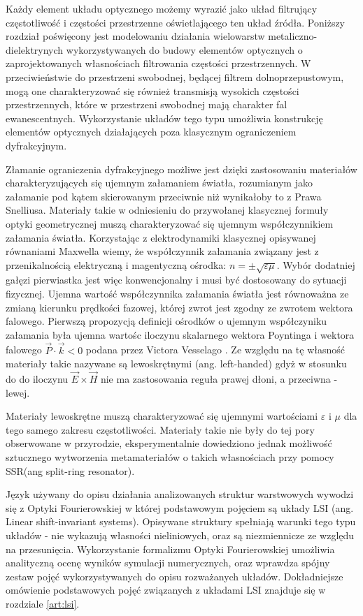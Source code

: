 Każdy element układu optycznego możemy wyrazić jako układ filtrujący częstotliwość i częstości przestrzenne oświetlającego ten układ źródła. Poniższy rozdział poświęcony jest modelowaniu działania wielowarstw metaliczno-dielektrynych wykorzystywanych do  budowy elementów optycznych o zaprojektowanych własnościach filtrowania częstości przestrzennych. W przeciwieństwie do przestrzeni swobodnej, będącej filtrem dolnoprzepustowym, mogą one charakteryzować się również transmisją wysokich częstości przestrzennych, które w przestrzeni swobodnej mają charakter fal ewanescentnych. Wykorzystanie układów tego typu umożliwia konstrukcję elementów optycznych działających poza klasycznym ograniczeniem dyfrakcyjnym.

Złamanie ograniczenia dyfrakcyjnego możliwe jest dzięki zastosowaniu materiałów charakteryzujących się ujemnym załamaniem światła, rozumianym jako załamanie pod kątem skierowanym przeciwnie niż wynikałoby to z Prawa Snelliusa. Materiały takie w odniesieniu do przywołanej klasycznej formuły optyki geometrycznej muszą charakteryzować się ujemnym współczynnikiem załamania światła. Korzystając z elektrodynamiki klasycznej opisywanej równaniami Maxwella wiemy, że współczynnik załamania związany jest z przenikalnością elektryczną i magentyczną ośrodka: $n = \pm \sqrt{ \varepsilon \mu}$. Wybór dodatniej gałęzi pierwiastka jest więc konwencjonalny i musi być dostosowany do sytuacji fizycznej. Ujemna wartość współczynnika załamania światła jest równoważna ze zmianą kierunku prędkości fazowej, której zwrot jest zgodny ze zwrotem wektora falowego. Pierwszą propozycją definicji ośrodków o ujemnym współczyniku załamania była ujemna wartośc iloczynu skalarnego wektora Poyntinga i wektora falowego $\vec{P} \cdot \vec{k} < 0$ podana przez Victora Vesselago \cite{veselago1968electrodynamics}. Ze względu na tę własność materiały takie nazywane są lewoskrętnymi (ang. left-handed) gdyż w stosunku do do iloczynu $\vec{E} \times \vec{H}$ nie ma zastosowania reguła prawej dłoni, a przeciwna - lewej.

Materiały lewoskrętne muszą charakteryzować się ujemnymi wartościami $\varepsilon$ i $\mu$ dla tego samego zakresu częstotliwości. Materiały takie nie były do tej pory obserwowane w przyrodzie, eksperymentalnie dowiedziono jednak możliwość sztucznego wytworzenia metamateriałów o takich własnościach\cite{PhysRevLett.84.4184} przy pomocy SSR(ang split-ring resonator). 

Język używany do opisu działania analizowanych struktur warstwowych wywodzi się z Optyki Fourierowskiej w której podstawowym pojęciem są układy LSI (ang. Linear shift-invariant systems). Opisywane struktury spełniają warunki tego typu układów - nie wykazują własności nieliniowych, oraz są niezmiennicze ze względu na przesunięcia. Wykorzystanie formalizmu Optyki Fourierowskiej umożliwia analityczną ocenę wyników symulacji numerycznych, oraz wprawdza spójny zestaw pojęć wykorzystywanych do opisu rozważanych układów. Dokładniejsze omówienie podstawowych pojęć związanych z układami LSI znajduje się w rozdziale \ref{art:lsi}.



